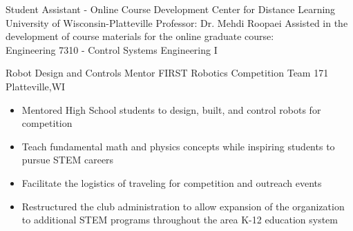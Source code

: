 \documentclass[11pt,letterpaper,roman]{moderncv} %
\begin{document}


{Student Assistant - Online Course Development}
{Center for Distance Learning}
{University of Wisconsin-Platteville}
{Professor: Dr. Mehdi Roopaei}
{
    Assisted in the development of course materials for the online graduate course:\\ 
    Engineering 7310 - Control Systems Engineering I
}

{Robot Design and Controls Mentor}
{FIRST Robotics Competition Team 171}
{Platteville,WI}{}{
\begin{itemize}
    \item Mentored High School students to design, built, and control robots for competition
    \item Teach fundamental math and physics concepts while inspiring students to pursue STEM careers
    \item Facilitate the logistics of traveling for competition and outreach events
    \item Restructured the club administration to allow expansion of the organization to additional STEM programs throughout the area K-12 education system
\end{itemize}
}

\end{document}
